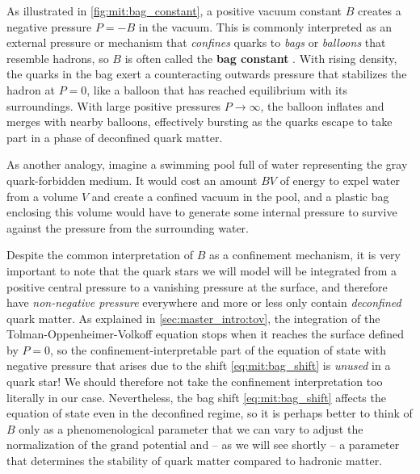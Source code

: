 As illustrated in \cref{fig:mit:bag_constant},
a positive vacuum constant $B$ creates a negative pressure $P = -B$ in the vacuum.
This is commonly interpreted as an external pressure or mechanism that \emph{confines} quarks to \emph{bags} or \emph{balloons} that resemble hadrons,
so $B$ is often called the \textbf{bag constant}%
.
With rising density, the quarks in the bag exert a counteracting outwards pressure that stabilizes the hadron at $P=0$,
like a balloon that has reached equilibrium with its surroundings.
With large positive pressures $P \rightarrow \infty$, the balloon inflates and merges with nearby balloons,
effectively bursting as the quarks escape to take part in a phase of deconfined quark matter.

\iffalse
A positive vacuum constant $B$ creates a negative pressure $P = -B$ in the vacuum.
In a sense, it can therefore be interpreted as a mechanism that \emph{confines} the quarks to ``bags'' that resemble hadrons.
Due to this common physical interpretation, $B$ is often called the \textbf{bag constant}.
The quarks in the bag exert an outwards kinetic pressure that counteracts the external bag pressure and stabilizes the hadron.
The bag constant can therefore be interpreted as the pressure difference between two phases of confined and deconfined vacuum,
as illustrated in \cref{fig:mit:bag_constant}.
\fi

As another analogy, imagine a swimming pool full of water representing the gray quark-forbidden medium.
It would cost an amount $BV$ of energy to expel water from a volume $V$ and create a confined vacuum in the pool,
and a plastic bag enclosing this volume would have to generate some internal pressure to survive against the pressure from the surrounding water.

Despite the common interpretation of $B$ as a confinement mechanism,
it is very important to note that the quark stars we will model 
will be integrated from a positive central pressure to a vanishing pressure at the surface,
and therefore have \emph{non-negative pressure} everywhere and more or less only contain \emph{deconfined} quark matter.
As explained in \cref{sec:master_intro:tov}, the integration of the Tolman-Oppenheimer-Volkoff equation stops when it reaches the surface defined by $P=0$,
so the confinement-interpretable part of the equation of state with negative pressure that arises due to the shift \eqref{eq:mit:bag_shift} is \emph{unused} in a quark star!
We should therefore not take the confinement interpretation too literally in our case.
Nevertheless, the bag shift \eqref{eq:mit:bag_shift} affects the equation of state even in the deconfined regime,
so it is perhaps better to think of $B$ only as a phenomenological parameter that we can vary to adjust the normalization of the grand potential
and -- as we will see shortly -- a parameter that determines 
the stability of quark matter compared to hadronic matter.

